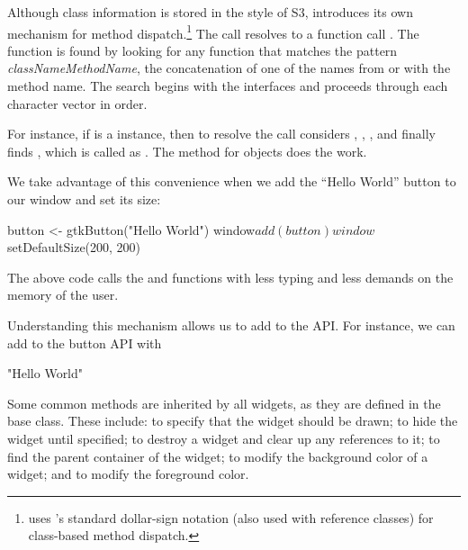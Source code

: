 Although class information is stored in the style of S3, 
introduces its own mechanism for method
dispatch.\footnote{ uses \R's standard dollar-sign
  notation (also used with reference classes) for class-based method
  dispatch.}  The call   resolves to a function
call . The function is found by looking for any
function that matches the pattern \emph{classNameMethodName}, the
concatenation of one of the names from  or
 with the method name. The search begins with the
interfaces and proceeds through each character vector in order.

For instance, if  is a  instance, then
to resolve the call   considers
, ,
,  and finally finds
, which is called as
. The  method
for  objects does the work.

We take advantage of this convenience when we add the ``Hello World''
button to our window and set its size:
\begin{Schunk}
\begin{Sinput}
 button <- gtkButton("Hello World")
 window$add(button)
 window$setDefaultSize(200, 200)
\end{Sinput}
\end{Schunk}
%
The above code calls the  and
 functions with less typing and less
demands on the memory of the user.

Understanding this mechanism allows us to add to the 
API. For instance, we can add to the button API with
\begin{Schunk}
\begin{Soutput}
[1] "Hello World"
\end{Soutput}
\end{Schunk}

Some common methods are inherited by all widgets, as they are defined
in the base  class. These include: 
 to specify that the widget should be drawn;
 to hide the widget until specified;
 to destroy a widget and clear up any
references to it;  to find the parent
container of the widget;  to modify the
background color of a widget; and  to
modify the foreground color.


